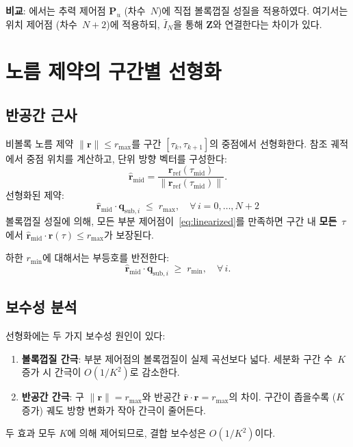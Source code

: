 \documentclass[11pt]{article}
\begin{document}
\textbf{비교}: \cite{report005}에서는 추력 제어점 $\mathbf{P}_u$
(차수~$N$)에 직접 볼록껍질 성질을 적용하였다.
여기서는 위치 제어점 (차수~$N{+}2$)에 적용하되,
$\bar{I}_N$을 통해 $\mathbf{Z}$와 연결한다는 차이가 있다.

\section{노름 제약의 구간별 선형화}

\subsection{반공간 근사}

비볼록 노름 제약 $\|\mathbf{r}\| \le r_{\max}$를
구간 $[\tau_k, \tau_{k+1}]$의 중점에서 선형화한다.
참조 궤적에서 중점 위치를 계산하고, 단위 방향 벡터를 구성한다:
\begin{equation}
  \hat{\mathbf{r}}_{\mathrm{mid}} =
    \frac{\mathbf{r}_{\mathrm{ref}}(\tau_{\mathrm{mid}})}
         {\|\mathbf{r}_{\mathrm{ref}}(\tau_{\mathrm{mid}})\|}.
\end{equation}
선형화된 제약:
\begin{equation}\label{eq:linearized}
  \boxed{
    \hat{\mathbf{r}}_{\mathrm{mid}} \cdot \mathbf{q}_{\mathrm{sub},i}
    \;\le\; r_{\max}, \quad \forall\,i = 0,\ldots,N{+}2
  }
\end{equation}
볼록껍질 성질에 의해, 모든 부분 제어점이~\eqref{eq:linearized}를
만족하면 구간 내 \textbf{모든}~$\tau$에서
$\hat{\mathbf{r}}_{\mathrm{mid}} \cdot \mathbf{r}(\tau) \le r_{\max}$가 보장된다.

하한 $r_{\min}$에 대해서는 부등호를 반전한다:
\begin{equation}
  \hat{\mathbf{r}}_{\mathrm{mid}} \cdot \mathbf{q}_{\mathrm{sub},i}
  \;\ge\; r_{\min}, \quad \forall\,i.
\end{equation}

\subsection{보수성 분석}

선형화에는 두 가지 보수성 원인이 있다:
\begin{enumerate}
  \item \textbf{볼록껍질 간극}: 부분 제어점의 볼록껍질이
        실제 곡선보다 넓다. 세분화 구간 수~$K$ 증가 시
        간극이 $O(1/K^2)$로 감소한다.
  \item \textbf{반공간 간극}: 구 $\|\mathbf{r}\| = r_{\max}$와
        반공간 $\hat{\mathbf{r}} \cdot \mathbf{r} = r_{\max}$의 차이.
        구간이 좁을수록 ($K$ 증가) 궤도 방향 변화가 작아 간극이 줄어든다.
\end{enumerate}
두 효과 모두 $K$에 의해 제어되므로, 결합 보수성은 $O(1/K^2)$이다.
\end{document}
